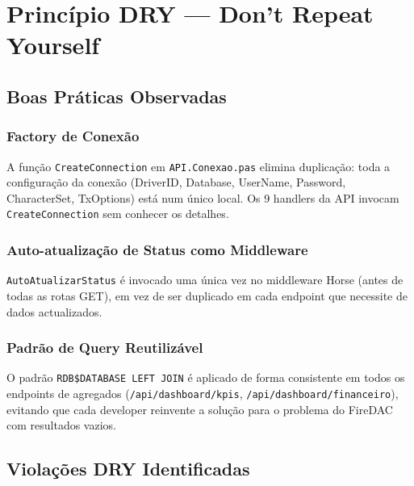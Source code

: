 \documentclass[12pt,a4paper]{article}
\begin{document}
\newpage
\section{Princípio DRY — Don't Repeat Yourself}

\subsection{Boas Práticas Observadas}

\subsubsection{Factory de Conexão}

A função \texttt{CreateConnection} em \texttt{API.Conexao.pas} elimina duplicação: toda a configuração da conexão (DriverID, Database, UserName, Password, CharacterSet, TxOptions) está num único local. Os 9 handlers da API invocam \texttt{CreateConnection} sem conhecer os detalhes.

\subsubsection{Auto-atualização de Status como Middleware}

\texttt{AutoAtualizarStatus} é invocado uma única vez no middleware Horse (antes de todas as rotas GET), em vez de ser duplicado em cada endpoint que necessite de dados actualizados.

\subsubsection{Padrão de Query Reutilizável}

O padrão \texttt{RDB\$DATABASE LEFT JOIN} é aplicado de forma consistente em todos os endpoints de agregados (\texttt{/api/dashboard/kpis}, \texttt{/api/dashboard/financeiro}), evitando que cada developer reinvente a solução para o problema do FireDAC com resultados vazios.

\subsection{Violações DRY Identificadas}
\end{document}
